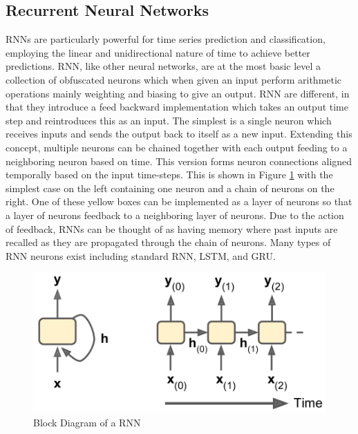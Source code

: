 \subsection{Recurrent Neural Networks}
RNNs are particularly powerful for time series prediction and classification, employing the linear and unidirectional nature of time to achieve better predictions. RNN, like other neural networks, are at the most basic level a collection of obfuscated neurons which when given an input perform arithmetic operations mainly weighting and biasing to give an output. RNN are different, in that they introduce a feed backward implementation which takes an output time step and reintroduces this as an input. The simplest is a single neuron which receives inputs and sends the output back to itself as a new input. Extending this concept, multiple neurons can be chained together with each output feeding to a neighboring neuron based on time. This version forms neuron connections aligned temporally based on the input time-steps. This is shown in Figure \ref{fig:lstm_dia} with the simplest case on the left containing one neuron and a chain of neurons on the right. One of these yellow boxes can be implemented as a layer of neurons so that a layer of neurons feedback to a neighboring layer of neurons. Due to the action of feedback, RNNs can be thought of as having memory where past inputs are recalled as they are propagated through the chain of neurons. Many types of RNN neurons exist including standard RNN, LSTM, and GRU.

\begin{figure}[ht]
    \centering
    \includegraphics[width=.5\linewidth]{lstm/lstm_diagram.png}
    \caption{Block Diagram of a RNN}
    \label{fig:lstm_dia}
\end{figure}

